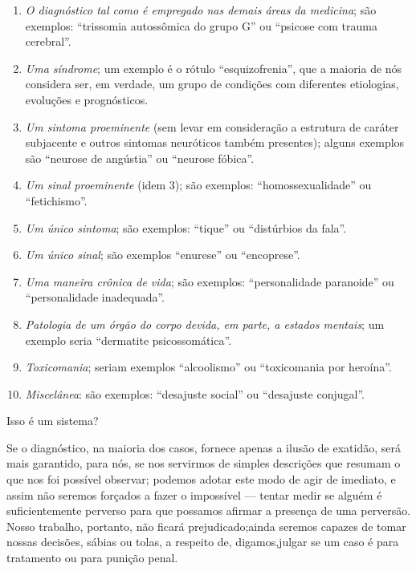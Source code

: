 \begin{enumerate}

\item \textit{O diagnóstico tal como é empregado nas demais áreas da
medicina}; são exemplos: ``trissomia autossômica do grupo G'' ou ``psicose com trauma cerebral''.

\item \textit{Uma síndrome}; um exemplo é o rótulo ``esquizofrenia'',\idxesquiz{}
que a maioria de nós considera ser, em verdade, um grupo de condições com diferentes
etiologias, evoluções e prognósticos.

\item \textit{Um sintoma proeminente} (sem levar em consideração a
estrutura de caráter subjacente e outros sintomas neuróticos também
presentes); alguns exemplos são ``neurose de angústia'' ou ``neurose
fóbica''.

\item \textit{Um sinal proeminente} (idem 3); são exemplos:
``homossexualidade'' ou ``fetichismo''.

\item \textit{Um único sintoma}; são exemplos:
``tique'' ou ``distúrbios da fala''.

\item \textit{Um único sinal}; são exemplos
``enurese'' ou ``encoprese''.

\item \textit{Uma maneira crônica de vida}; são exemplos:
``personalidade paranoide'' ou ``personalidade inadequada''.

\item \textit{Patologia de um órgão do corpo devida, em parte, a
estados mentais}; um exemplo seria ``dermatite psicossomática''.

\item \textit{Toxicomania}; seriam exemplos ``alcoolismo'' ou ``toxicomania
por heroína''.

\item \textit{Miscelânea}: são exemplos: ``desajuste
social'' ou ``desajuste conjugal''.

\end{enumerate}

Isso é um sistema?

Se o diagnóstico, na maioria dos casos, fornece apenas a ilusão de
exatidão, será mais garantido, para nós, se nos servirmos de simples
descrições que resumam o que nos foi possível observar; podemos adotar
este modo de agir de imediato, e assim não seremos forçados a fazer o
impossível --- tentar medir se alguém é suficientemente perverso para que
possamos afirmar a presença de uma perversão. Nosso trabalho, portanto,
não ficará prejudicado;\idxclass[|)] ainda seremos capazes de tomar nossas decisões,
sábias ou tolas, a respeito de, digamos,\idxdiag[|)] julgar se um caso é para
tratamento ou para punição penal.

